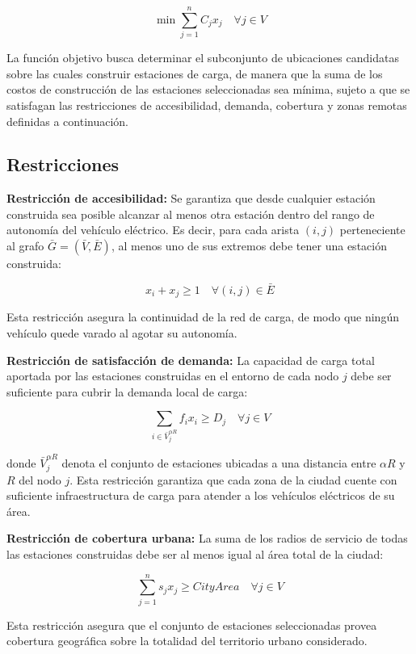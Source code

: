 \documentclass[letter, 10pt]{article}
\begin{document}
\[
\min \sum_{j=1}^{n} C_j x_j \quad \forall j \in V \tag{1}
\]

La función objetivo busca determinar el subconjunto de ubicaciones candidatas sobre las 
cuales construir estaciones de carga, de manera que la suma de los costos de construcción 
de las estaciones seleccionadas sea mínima, sujeto a que se satisfagan las restricciones 
de accesibilidad, demanda, cobertura y zonas remotas definidas a continuación.

\subsection{Restricciones}

\textbf{Restricción de accesibilidad:} Se garantiza que desde cualquier estación construida 
sea posible alcanzar al menos otra estación dentro del rango de autonomía del vehículo 
eléctrico. Es decir, para cada arista $(i,j)$ perteneciente al grafo $\bar{G} = (\bar{V}, \bar{E})$, 
al menos uno de sus extremos debe tener una estación construida:

\[
x_i + x_j \geq 1 \quad \forall (i,j) \in \bar{E} \tag{2}
\]

Esta restricción asegura la continuidad de la red de carga, de modo que ningún vehículo 
quede varado al agotar su autonomía.

\textbf{Restricción de satisfacción de demanda:} La capacidad de carga total aportada por 
las estaciones construidas en el entorno de cada nodo $j$ debe ser suficiente para cubrir 
la demanda local de carga:

\[
\sum_{i \in \bar{V}_j^{\alpha R}} f_i x_i \geq D_j \quad \forall j \in V \tag{3}
\]

donde $\bar{V}_j^{\alpha R}$ denota el conjunto de estaciones ubicadas a una distancia 
entre $\alpha R$ y $R$ del nodo $j$. Esta restricción garantiza que cada zona de la ciudad 
cuente con suficiente infraestructura de carga para atender a los vehículos eléctricos 
de su área.

\textbf{Restricción de cobertura urbana:} La suma de los radios de servicio de todas las 
estaciones construidas debe ser al menos igual al área total de la ciudad:

\[
\sum_{j=1}^{n} s_j x_j \geq \mathit{CityArea} \quad \forall j \in V \tag{4}
\]

Esta restricción asegura que el conjunto de estaciones seleccionadas provea cobertura 
geográfica sobre la totalidad del territorio urbano considerado.
\end{document}

